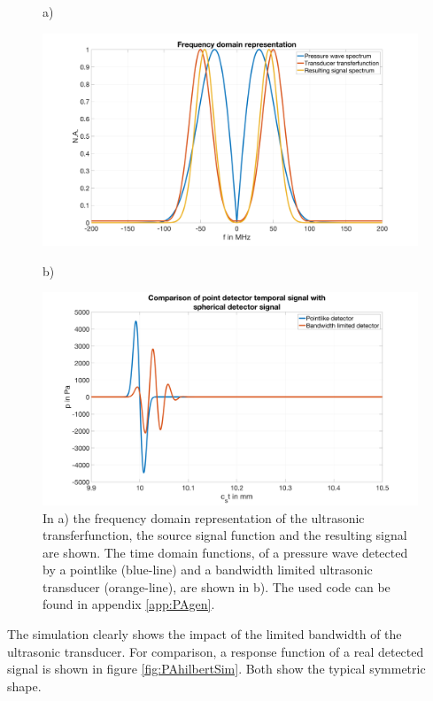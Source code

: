 \begin{figure}[H]
	a)
	\begin{minipage}{0.5\textwidth}		
		\includegraphics[width = \textwidth, height=0.25\textheight]{02_principles_of_photoacoustics/images/freqSphericalDet.png}
	\end{minipage}
	b)
	\begin{minipage}{0.5\textwidth}		
		\includegraphics[width = \textwidth, height=0.25\textheight]{02_principles_of_photoacoustics/images/timeSphericalDet.png}
	\end{minipage}	
	\caption{In a) the frequency domain representation of the ultrasonic transferfunction, the source signal function and the resulting signal are shown. The time domain functions, of a pressure wave detected by a pointlike (blue-line) and a bandwidth limited ultrasonic transducer (orange-line), are shown in b). The used code can be found in appendix \ref{app:PAgen}.}
	\label{fig:freqTimePAsig}
\end{figure} 

The simulation clearly shows the impact of the limited bandwidth of the ultrasonic transducer. For comparison, a response function of a real detected signal is shown in figure \ref{fig:PAhilbertSim}. Both show the typical symmetric shape. 

